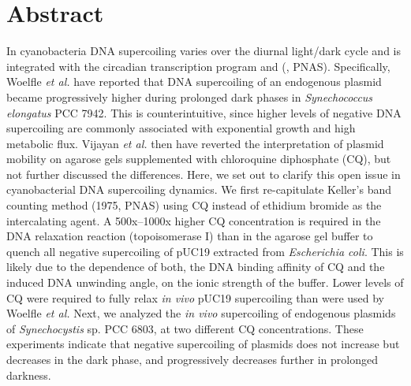 \documentclass[10pt,a4]{article}
\begin{document}
\section*{Abstract}
In cyanobacteria DNA supercoiling varies over the diurnal light/dark
cycle and is integrated with the circadian transcription program and
(\citet{Woelfle2007, Vijayan2009}, PNAS). Specifically, Woelfle
\textit{et al.} have reported that DNA supercoiling of an endogenous
plasmid became progressively higher during prolonged dark phases in
\textit{Synechococcus elongatus} PCC 7942.  This is counterintuitive,
since higher levels of negative DNA supercoiling are commonly
associated with exponential growth and high metabolic flux. Vijayan
\textit{et al.} then have reverted the interpretation of plasmid
mobility on agarose gels supplemented with chloroquine diphosphate
(CQ), but not further discussed the differences.
%
Here, we set out to clarify this open issue in cyanobacterial DNA
supercoiling dynamics. We first re-capitulate Keller's band counting
method (1975, PNAS) using CQ instead of ethidium bromide as the
intercalating agent.  A 500x--1000x higher CQ concentration is
required in the DNA relaxation reaction (topoisomerase I) than in the
agarose gel buffer to quench all negative supercoiling of pUC19
extracted from \textit{Escherichia coli}. This is likely due to the
dependence of both, the DNA binding affinity of CQ and the induced DNA
unwinding angle, on the ionic strength of the buffer. Lower levels of
CQ were required to fully relax \textit{in vivo} pUC19 supercoiling
than were used by Woelfle \textit{et al.} Next, we analyzed the
\textit{in vivo} supercoiling of endogenous plasmids of
\textit{Synechocystis} sp.  PCC 6803, at two different CQ
concentrations.  These experiments indicate that negative supercoiling of
plasmids does not increase but decreases in the dark phase, and
progressively decreases further in prolonged darkness.

\linenumbers
\end{document}

